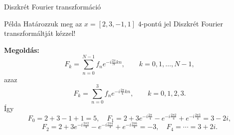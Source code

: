 \documentclass[table]{beamer}
\begin{document}
\begin{frame}[fragile]
{Diszkrét Fourier transzformáció}
\begin{block}
{Példa}
{Határozzuk meg az $x=[2,3, -1, 1]$ $4$-pontú jel Diszkrét Fourier transzformáltját kézzel!
 }
\end{block}
\textbf{Megoldás:}
\[
F_k=\sum\limits_{n=0}^{N-1}f_ne^{-i\frac{2\pi}{N}kn},\qquad k=0,1,\dots,N-1,
\] 
azaz
\[
F_k=\sum\limits_{n=0}^{3}f_ne^{-i\frac{2\pi}{4}kn},\qquad k=0,1,2,3.
\] 
Így
\[
F_0= 2+3-1+1=5,\quad F_1=2+3e^{-i\frac{2\pi}{4}}-e^{-i\frac{2\pi 2}{4}}+e^{-i\frac{2\pi 3}{4}}=3-2i,
\]
\[
F_2=2+3e^{-i\frac{2\pi 2}{4}}-e^{-i\frac{2\pi 4}{4}}+e^{-i\frac{2\pi 6}{4}}=-3,\quad F_4=\cdots=3+2i.
\]
\end{frame}
\end{document}
